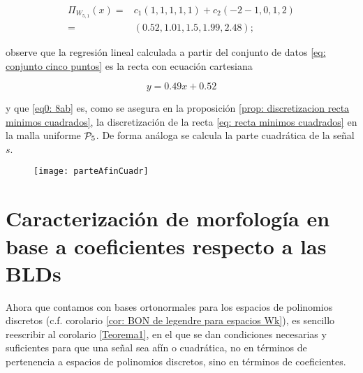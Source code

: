 \begin{ejemplo}
\begin{align}
\label{eq0: 8ab}
\Pi_{W_{5,1}}(x) =& c_{1} (1,1,1,1,1) + c_{2}(-2-1,0,1,2) \nonumber \\
= & (0.52, 1.01, 1.5, 1.99, 2.48 );
\end{align}

observe que 
la regresión lineal calculada a partir
del conjunto de datos
\eqref{eq: conjunto cinco puntos}
es la recta
con ecuación cartesiana

\begin{equation} \label{eq: recta minimos cuadrados}
y=0.49x+0.52
\end{equation}

y que \eqref{eq0: 8ab} es, 
como se asegura en la proposición
\ref{prop: discretizacion recta minimos cuadrados}, la discretización de 
la recta \eqref{eq: recta minimos cuadrados}
en la malla uniforme $\mathcal{P}_{5}$.
De forma análoga se calcula la parte cuadrática de
la señal $s$.

\begin{figure}[H]
	\centering
	\texttt{[image: parteAfinCuadr]}
\end{figure}	
\final
\end{ejemplo}


\section{Caracterización de morfología en base a coeficientes respecto a las BLDs}
\label{Caracterización de la morfología en términos de coeficientes respecto a la base de Legendre discreta}


Ahora que contamos con bases ortonormales
para los espacios de polinomios discretos
(c.f. corolario \ref{cor: BON de legendre para espacios Wk}),
es sencillo reescribir al corolario
\ref{Teorema1},
en el que se dan condiciones necesarias y suficientes para que
una señal sea afín o cuadrática,
no en términos de pertenencia a espacios de polinomios
discretos,
sino en términos de coeficientes.


